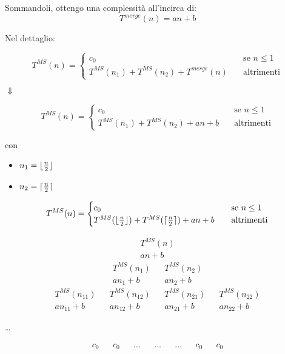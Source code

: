 Sommandoli, ottengo una complessità all'incirca di:
\begin{displaymath}
	T^{merge}(n) = an+b
\end{displaymath}

Nel dettaglio: 

\[ T^{MS}(n) =
\begin{cases}
	c_0       & \quad \text{se } n \leq 1 \\
	T^{MS}(n_1)+T^{MS}(n_2)+T^{merge}(n)  & \quad \text{altrimenti}
\end{cases}
\]

\begin{center}
	$\Downarrow$ \\
\end{center}

\[ T^{MS}(n) =
\begin{cases}
c_0       & \quad \text{se } n \leq 1 \\
T^{MS}(n_1)+T^{MS}(n_2)+an+b  & \quad \text{altrimenti}
\end{cases}
\]

con 

\begin{itemize}
	\item[] $n_1 = \lfloor\frac{n}{2}\rfloor$
	\item[] $n_2 = \lceil\frac{n}{2}\rceil$
\end{itemize}

\[ T^{MS}(n) =
\begin{cases}
c_0       & \quad \text{se } n \leq 1 \\
T^{MS}(\lfloor\frac{n}{2}\rfloor)+T^{MS}(\lceil\frac{n}{2}\rceil)+an+b  & \quad \text{altrimenti}
\end{cases}
\]

\begin{preventpagebreak}
\begin{align*}
	T^{MS}(n) \\
	an+b
\end{align*}
\begin{align*}
	T^{MS}(n_1) && T^{MS}(n_2) \\
	an_1+b && an_2+b
\end{align*}
\begin{align*}
T^{MS}(n_{11}) && T^{MS}(n_{12}) && T^{MS}(n_{21}) && T^{MS}(n_{22}) \\
an_{11}+b && an_{12}+b && an_{21}+b && an_{22}+b
\end{align*}
\begin{center}
	\dots
\end{center}
\begin{align*}
	c_0 && c_0 && \dots && \dots && \dots && c_0 && c_0 \\
\end{align*}
\end{preventpagebreak}

